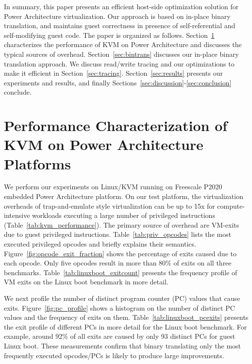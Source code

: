 \documentclass[10pt,twocolumn]{article}
\begin{document}
In summary, this paper presents an efficient host-side optimization solution for
Power Architecture virtualization. Our approach is based on in-place binary translation,
and maintains guest correctness in presence of self-referential and self-modifying
guest code.
The paper is organized as
follows. Section~\ref{sec:performance_char} characterizes the performance of
KVM on Power Architecture and discusses the typical sources of overhead.
Section~\ref{sec:bintrans} discusses our in-place binary translation approach.
We discuss read/write tracing and our optimizations to make
it efficient in Section~\ref{sec:tracing}.
Section~\ref{sec:results} presents our experiments and results, and
finally Sections~\ref{sec:discussion}-\ref{sec:conclusion} conclude.

\section{Performance Characterization of KVM on Power Architecture Platforms}
\label{sec:performance_char}
We perform our experiments on Linux/KVM running on Freescale P2020
embedded Power Architecture platform.
On our test platform, the virtualization overheads
of trap-and-emulate style virtualization can be up to 15x for compute-intensive
workloads executing a large number of privileged
instructions (Table~\ref{tab:kvm_performance}). The primary source of
overhead are VM-exits due to guest privileged instructions.
Table~\ref{tab:priv_opcodes} lists the most executed privileged
opcodes and briefly explains their semantics.
Figure~\ref{fig:opcode_exit_fraction} shows the percentage of exits caused
due to each opcode. Only five opcodes result in more than 80\% of exits on all
three benchmarks. Table~\ref{tab:linuxboot_exitcount} presents the frequency
profile of VM exits on the Linux boot benchmark in more detail.

We next profile the number of distinct program counter (PC) values that
cause exits. Figure~\ref{fig:pc_profile} shows a histogram on the number
of distinct PC values and the frequency of exits on them.
Table~\ref{tab:linuxboot_pcexits} presents the exit profile of different
PCs in more detail for the Linux boot benchmark. For example, around 92\% of all
exits are caused by only 93 distinct PCs for guest Linux boot. These
measurements confirm that
binary translating
only the most frequently executed opcodes/PCs is likely to produce large
improvements.
\end{document}
